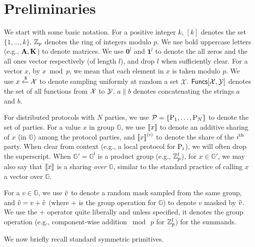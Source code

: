 
\section{Preliminaries}
\label{sec:preliminaries}

 We start with some basic notation.
For a positive integer $k$, $[k]$ denotes the set $\{1,\dots, k\}$. $\mathbb{Z}_p$ denotes the ring of integers modulo $p$. We use bold uppercase letters (e.g., $\mat{A}, \mat{K}$) to denote matrices. We use $\textbf{0}^l$ and $\textbf{1}^l$ to denote the all zeros and the all ones vector respectively (of length $l$), and drop $l$ when sufficiently clear. For a vector $x$, by $x \bmod p$, we mean that each element in $x$ is taken modulo $p$. We use $x \xleftarrow{\$} \mathcal{X}$ to denote sampling uniformly at random a set $\mathcal{X}$. $\mathsf{Funcs}[\mathcal{X}, \mathcal{Y}]$ denotes the set of all functions from $\mathcal{X}$ to $\mathcal{Y}$. $a \parallel b$ denotes concatenating the strings $a$ and $b$.

For distributed protocols with $N$ parties, we use $\mathcal{P} = \{\textnormal{P}_1, \dots, \textnormal{P}_N\}$ to denote the set of parties. For a value $x$ in group $\mathbb{G}$, we use $\left\llbracket x \right\rrbracket$ to denote an additive sharing of $x$ (in $\mathbb{G}$) among the protocol parties, and $\left\llbracket x \right\rrbracket^{(i)}$ to denote the share of the $i^{\textnormal{th}}$ party. When clear from context (e.g., a local protocol for $\textnormal{P}_i$), we will often drop the superscript. When $\mathbb{G}' =  \mathbb{G}^l$ is a product group (e.g., $\mathbb{Z}_p^l$), for $x \in \mathbb{G}'$, we may also say that $\left\llbracket x \right\rrbracket$ is a sharing \textit{over} $\mathbb{G}$, similar to the standard practice of calling $x$ a vector over $\mathbb{G}$.

For a $v \in \mathbb{G}$, we use $\tilde{v}$ to denote a random mask sampled from the same group, and $\hat{v} = v + \tilde{v}$ (where + is the group operation for $\mathbb{G}$) to denote $v$ masked by $\tilde{v}$. We use the $+$ operator quite liberally and unless specified, it denotes the group operation (e.g., component-wise addition $\bmod~p$ for $\mathbb{Z}_p^l$) for the summands.


\smallskip
\noindent We now briefly recall standard symmetric primitives.

